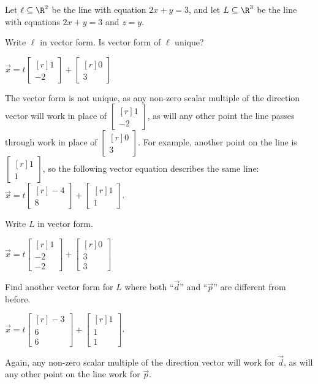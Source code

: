 \documentclass{problemset}
\newcommand{\mat}[1]{\begin{bmatrix*}[r]#1\end{bmatrix*}}
\begin{document}
	\question
	Let $\ell\subseteq \R^2$ be the line with equation $2x+y=3$,
	and let $L\subseteq \R^3$ be the line with equations $2x+y=3$ and
	$z=y$.
	\begin{parts}
		\item Write $\ell$ in vector form. Is vector form of $\ell$ unique?
			\begin{solution}
				$\vec x = t \mat{1 \\ -2} + \mat{0 \\ 3}$

				The vector form is not unique, as any non-zero scalar multiple of 
				the direction vector will work in place of $\mat{1 \\ -2}$, as 
				will any other point the line passes through work in place of 
				$\mat{0 \\3}$. For example, another point on the line is 
				$\mat{1 \\ 1}$, so the following vector equation describes the 
				same line: $\vec x = t \mat{-4 \\ 8} + \mat{1 \\ 1}$.
			\end{solution}
		\item Write $L$ in vector form.
			\begin{solution}[inline]
				$\vec x = t\mat{1 \\ -2 \\ -2} + \mat{0 \\ 3 \\ 3}$
			\end{solution}
		\item Find another vector form for $L$ where both ``$\vec d$'' and
			``$\vec p$'' are different from before.
			\begin{solution}
				$\vec x = t \mat{-3 \\ 6 \\ 6} + \mat{1 \\ 1 \\ 1}$.

				Again, any non-zero scalar multiple of the direction vector 
				will work for $\vec d$, as will any other point on the line 
				work for $\vec p$. 
			\end{solution}
	\end{parts}
\end{document}
